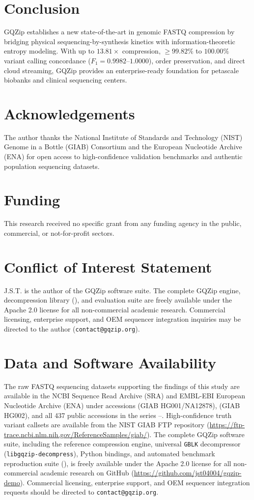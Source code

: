\documentclass[10pt,twocolumn,a4paper]{article}
\begin{document}
\section{Conclusion}
GQZip establishes a new state-of-the-art in genomic FASTQ compression by bridging physical sequencing-by-synthesis kinetics with information-theoretic entropy modeling. With up to $13.81\times$ compression, $\ge 99.82\%$ to $100.00\%$ variant calling concordance ($F_1 = 0.9982\text{--}1.0000$), order preservation, and direct cloud streaming, GQZip provides an enterprise-ready foundation for petascale biobanks and clinical sequencing centers.

\section*{Acknowledgements}
The author thanks the National Institute of Standards and Technology (NIST) Genome in a Bottle (GIAB) Consortium and the European Nucleotide Archive (ENA) for open access to high-confidence validation benchmarks and authentic population sequencing datasets.

\section*{Funding}
This research received no specific grant from any funding agency in the public, commercial, or not-for-profit sectors.

\section*{Conflict of Interest Statement}
J.S.T. is the author of the GQZip software suite. The complete GQZip engine, decompression library (), and evaluation suite are freely available under the Apache 2.0 license for all non-commercial academic research. Commercial licensing, enterprise support, and OEM sequencer integration inquiries may be directed to the author (\texttt{contact@gqzip.org}).

\section*{Data and Software Availability}
The raw FASTQ sequencing datasets supporting the findings of this study are available in the NCBI Sequence Read Archive (SRA) and EMBL-EBI European Nucleotide Archive (ENA) under accessions  (GIAB HG001/NA12878),  (GIAB HG002), and all 437 public accessions in the series --. High-confidence truth variant callsets are available from the NIST GIAB FTP repository (\url{https://ftp-trace.ncbi.nlm.nih.gov/ReferenceSamples/giab/}). The complete GQZip software suite, including the reference compression engine, universal \texttt{GBLK} decompressor (\texttt{libgqzip-decompress}), Python bindings, and automated benchmark reproduction suite (), is freely available under the Apache 2.0 license for all non-commercial academic research on GitHub (\url{https://github.com/jst04004/gqzip-demo}). Commercial licensing, enterprise support, and OEM sequencer integration requests should be directed to \texttt{contact@gqzip.org}.
\end{document}
